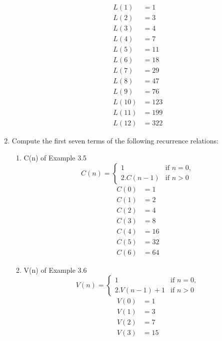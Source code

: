 \documentclass[12pt]{article}
\begin{document}
\begin{enumerate}
\begin{enumerate}
\begin{align*}
            L(1) &= 1\\
            L(2) &= 3\\
            L(3) &= 4\\
            L(4) &= 7\\
            L(5) &= 11\\
            L(6) &= 18\\
            L(7) &= 29\\
            L(8) &= 47\\
            L(9) &= 76\\
            L(10) &= 123\\
            L(11) &= 199\\
            L(12) &= 322
        \end{align*}
    \end{enumerate}
    \newpage
    \item Compute the first seven terms of the following recurrence relations:
    \begin{enumerate}
        \item C(n) of Example 3.5
        \[
        C(n) = 
        \begin{cases} 
        1 &     \text{if } n = 0, \\
        2.C(n-1) & \text{if } n > 0 
        \end{cases}
        \]
        \begin{align*}
            C(0) &= 1\\
            C(1) &= 2\\
            C(2) &= 4\\
            C(3) &= 8\\
            C(4) &= 16\\
            C(5) &= 32\\
            C(6) &= 64
        \end{align*}
        \item V(n) of Example 3.6
        \[
        V(n) = 
        \begin{cases} 
        1 &     \text{if } n = 0, \\
        2.V(n-1) + 1 & \text{if } n > 0 
        \end{cases}
        \]
        \begin{align*}
            V(0) &= 1\\
            V(1) &= 3\\
            V(2) &= 7\\
            V(3) &= 15\\

\end{align*}
\end{enumerate}
\end{enumerate}
\end{document}
